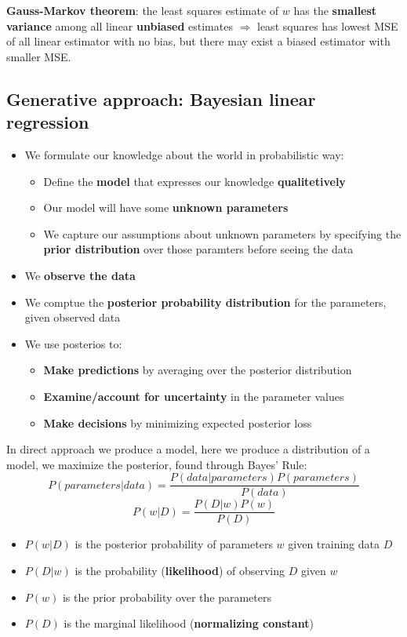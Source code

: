     \textbf{Gauss-Markov theorem}: the least squares estimate of $w$ has the \textbf{smallest variance} among all linear \textbf{unbiased} estimates $\Rightarrow$ least squares has lowest MSE of all linear estimator with no bias, but there may exist a biased estimator with smaller MSE.

\subsection{Generative approach: Bayesian linear regression}
    \begin{itemize}
        \item We formulate our knowledge about the world in probabilistic way:
        \begin{itemize}
            \item Define the \textbf{model} that expresses our knowledge \textbf{qualitetively}
            \item Our model will have some \textbf{unknown parameters}
            \item We capture our assumptions about unknown parameters by specifying the \textbf{prior distribution} over those paramters before seeing the data
        \end{itemize}
        \item We \textbf{observe the data}
        \item We comptue the \textbf{posterior probability distribution} for the parameters, given observed data
        \item We use posterios to:
        \begin{itemize}
            \item \textbf{Make predictions} by averaging over the posterior distribution
            \item \textbf{Examine/account for uncertainty} in the parameter values
            \item \textbf{Make decisions} by minimizing expected posterior loss
        \end{itemize}
    \end{itemize}
    In direct approach we produce a model, here we produce a distribution of a model, we maximize the posterior, found through Bayes' Rule:
    $$P(parameters|data)=\frac{
        P(data|parameters)P(parameters)
    }{P(data)}$$
    $$P(w|D)=\frac{P(D|w)P(w)}{P(D)}$$
    \begin{itemize}
        \item $P(w|D)$ is the posterior probability of parameters $w$ given training data $D$
        \item $P(D|w)$ is the probability (\textbf{likelihood}) of observing $D$ given $w$
        \item $P(w)$ is the prior probability over the parameters
        \item $P(D)$ is the marginal likelihood (\textbf{normalizing constant})
    \end{itemize}
